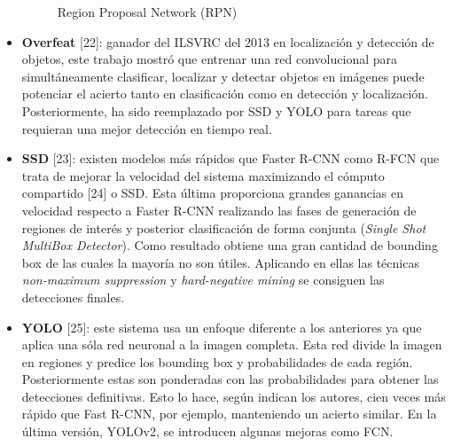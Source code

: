 \documentclass{bmvc2k}
\begin{document}
\begin{itemize}
\begin{figure}[h!]
\begin{center}
\caption{Region Proposal Network (RPN)}
\label{fig:fasterrcnn}
\end{center}
\end{figure}
\item \textbf{Overfeat} [22]: ganador del ILSVRC del 2013 en localización y detección de objetos, este trabajo mostró que entrenar una red convolucional para simultáneamente clasificar, localizar y detectar objetos en imágenes puede potenciar el acierto tanto en clasificación como en detección y localización. Posteriormente, ha sido reemplazado por SSD y YOLO para tareas que requieran una mejor detección en tiempo real.
\item \textbf{SSD} [23]: existen modelos más rápidos que Faster R-CNN como R-FCN que trata de mejorar la velocidad del sistema maximizando el cómputo compartido [24] o SSD. Esta última proporciona grandes ganancias en velocidad respecto a Faster R-CNN realizando las fases de generación de regiones de interés y posterior clasificación de forma conjunta (\textit{Single Shot MultiBox Detector}). Como resultado obtiene una gran cantidad de bounding box de las cuales la mayoría no son útiles. Aplicando en ellas las técnicas \textit{non-maximum suppression} y \textit{hard-negative mining} se consiguen las detecciones finales.
\item \textbf{YOLO} [25]: este sistema usa un enfoque diferente a los anteriores ya que aplica una sóla red neuronal a la imagen completa. Esta red divide la imagen en regiones y predice los bounding box y probabilidades de cada región. Posteriormente estas son ponderadas con las probabilidades para obtener las detecciones definitivas. Esto lo hace, según indican los autores, cien veces más rápido que Fast R-CNN, por ejemplo, manteniendo un acierto similar. En la última versión, YOLOv2, se introducen algunas mejoras como FCN.
\end{itemize}
\end{document}
